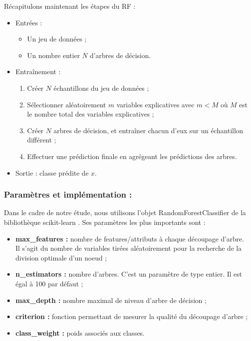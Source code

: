 \documentclass[11pt]{article}
\begin{document}
\begin{center}
Récapitulons maintenant les étapes du RF :

    \begin{itemize}
        \item Entrées :
            \begin{itemize}
                \item Un jeu de données ;
                \item Un nombre entier $N$ d’arbres de décision.
            \end{itemize}
            
        \item Entraînement :
            \begin{enumerate}
                \item Créer $N$ échantillons du jeu de données ;
                \item Sélectionner aléatoirement $m$ variables explicatives avec $m < M$ où $M$ est le nombre total des variables explicatives ;
                \item Créer $N$ arbres de décision, et entraîner chacun d'eux sur un échantillon différent ;
                \item Effectuer une prédiction finale en agrégeant les prédictions des arbres.
            \end{enumerate}
        
        \item Sortie : classe prédite de $x$.
    \end{itemize}

\subsubsection{Paramètres et implémentation :}

Dans le cadre de notre étude, nous utilisons l'objet RandomForestClassifier de la bibliothèque scikit-learn \cite{4}. Ses paramètres les plus importants sont :

\begin{itemize}
    \item \textbf{max\_features :} nombre de features/attributs à chaque découpage d'arbre. Il s'agit du nombre de variables tirées aléatoirement pour la recherche de la division optimale d'un noeud \cite{dobby} ;
    \item \textbf{n\_estimators :} nombre d'arbres. C'est un paramètre de type entier. Il est égal à 100 par défaut ;
    \item \textbf{max\_depth :} nombre maximal de niveau d'arbre de décision ;
    \item \textbf{criterion :} fonction permettant de mesurer la qualité du découpage d'arbre ;
    \item \textbf{class\_weight :} poids associés aux classes.
\end{itemize}


\end{center}
\end{document}
